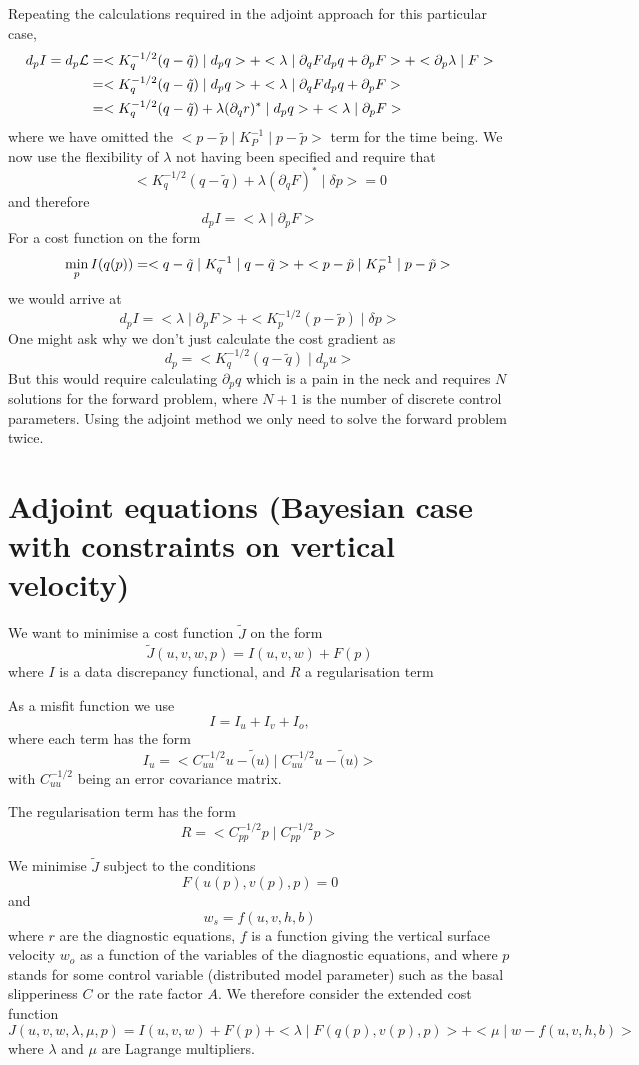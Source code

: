 \documentclass[10pt,a4paper]{book}
\newcommand{\p}{\partial}
\begin{document}
Repeating the calculations required in the adjoint approach for this particular case,
\begin{align*}
  d_p I=d_p \cal{L}
  &=  <K_q^{-1/2} (q-\tilde{q} ) \mid d_p q > +  <\lambda \mid \p_q F d_p q + \p_p F > + < \p_p \lambda \mid F >\\
  &=  <K_q^{-1/2} (q-\tilde{q} ) \mid d_p q > +  <\lambda \mid \p_q F d_p q + \p_p F > \\
  &= < K_q^{-1/2} (q-\tilde{q} ) + \lambda (\p_q r)^\ast \mid d_p q > + <\lambda \mid  \p_p F > 
\end{align*}
where we have omitted the $ < p -\tilde{p} \mid K_P^{-1} \mid p -\tilde{p} > $ term for the time being.
We now use the flexibility of $\lambda$ not having been specified and require that
\[
 < K_q^{-1/2} (q-\tilde{q} ) + \lambda (\p_q F)^\ast \mid \delta p >  =0 
\]
and therefore
\[
d_p I = < \lambda \mid \p_p F >
\]
For a cost function on the form
\[
\min_{p} I(q(p)) = < q -\tilde{q} \mid K_q^{-1} \mid q -\tilde{q} > + < p -\tilde{p} \mid K_P^{-1} \mid p -\tilde{p} >  \\
\]
we would arrive at 
\[
d_p I = < \lambda \mid \p_p F > + <K_p^{-1/2} (p-\tilde{p} ) \mid \delta p > 
\]
One might ask why we don't just calculate the cost gradient as
\[
d_p =  <K_q^{-1/2} (q-\tilde{q} ) \mid d_p u > 
\]
But this would require calculating $\p_p q$ which is a pain in the
neck and requires $N$ solutions for the forward problem, where $N+1$
is the number of discrete control parameters. Using the adjoint method
we only need to solve the forward problem twice.


\section{Adjoint equations (Bayesian case with constraints on vertical velocity)}

We want to minimise a cost function $\tilde{J}$ on the form
\[
\tilde{J}(u,v,w,p)=I(u,v,w)+F(p)
\]
where $I$ is a data discrepancy functional, and $R$ a regularisation term


As a misfit function we use
\[ I=I_u+I_v+I_o ,\]
where each term has the form
\[
I_u=<C^{-1/2}_{uu} u-\tilde(u)\mid C^{-1/2}_{uu} u-\tilde(u) >
\]
with $C^{-1/2}_{uu}$ being an error covariance matrix.

The regularisation term has the form
\[
R=<C^{-1/2}_{pp} p\mid C^{-1/2}_{pp} p >
\]

We minimise $\tilde{J}$ subject to the conditions 
\[ F(u(p),v(p),p)=0\]
and 
\[
w_s=f(u,v,h,b)
\]
where $r$ are the diagnostic equations, $f$ is a function giving
the vertical surface velocity $w_o$ as a function of the variables of
the diagnostic equations, and where $p$ stands for some control variable
(distributed model parameter) such as the basal slipperiness $C$ or
the rate factor $A$. We therefore consider the extended cost function
\[
J(u,v,w,\lambda,\mu,p)=I(u,v,w)+F(p)+<\lambda\mid F(q(p),v(p),p)>+<\mu\mid w-f(u,v,h,b)>
\]
where $\lambda$ and $\mu$ are Lagrange multipliers.
\end{document}
